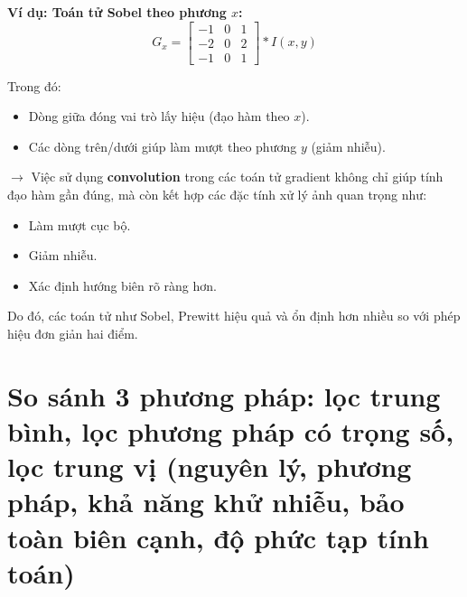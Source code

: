 \documentclass[12pt]{article}
\begin{document}
	\textbf{Ví dụ: Toán tử Sobel theo phương $x$:}
	\[
	G_x =
	\begin{bmatrix}
	-1 & 0 & 1 \\
	-2 & 0 & 2 \\
	-1 & 0 & 1
	\end{bmatrix}
	\ast I(x, y)
	\]
	
	Trong đó:
	\begin{itemize}
	\item Dòng giữa đóng vai trò lấy hiệu (đạo hàm theo $x$).
	\item Các dòng trên/dưới giúp làm mượt theo phương $y$ (giảm nhiễu).
	\end{itemize}
	
	$\rightarrow$ Việc sử dụng \textbf{convolution} trong các toán tử gradient không chỉ giúp tính đạo hàm gần đúng, mà còn kết hợp các đặc tính xử lý ảnh quan trọng như:
	\begin{itemize}
	\item Làm mượt cục bộ.
	\item Giảm nhiễu.
	\item Xác định hướng biên rõ ràng hơn.
	\end{itemize}
	
	Do đó, các toán tử như Sobel, Prewitt hiệu quả và ổn định hơn nhiều so với phép hiệu đơn giản hai điểm.
	
	\section{So sánh 3 phương pháp: lọc trung bình, lọc phương pháp có trọng số, lọc trung vị (nguyên lý, phương pháp, khả năng khử nhiễu, bảo toàn biên cạnh, độ phức tạp tính toán)}
	
\end{document}
